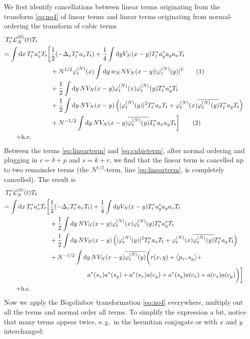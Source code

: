 \documentclass[11pt,a4paper,draft,DIV11]{scrartcl}	%
\newcommand{\di}{\textrm{d}}		%
\newcommand{\Lcal}{\mathcal{L}}		%
\newcommand{\hc}{\mbox{h.c.}}		%
\newcommand{\scal}[2]{\big<#1,#2\big>} %
\newcommand{\cc}[1]{\overline{#1}}	%
\newcommand{\ph}{\varphi_t^{(N)}}	%
\newcommand{\tagg}[1]{ \stepcounter{equation} \tag{\theequation} \label{eq:#1} } %
\newcommand{\eqr}[1]{\eqref{eq:#1}}			%
\begin{document}
We first identify cancellations between linear terms originating from the transform \eqr{no4} of linear terms and linear terms originating from normal-ordering the transform of cubic terms
\begin{align*}
T^*_t \Lcal^{(0)}_N(t) T_t \qquad \\
= \int \di x\, T^*_t a^*_x T_t \bigg[ &   \frac{1}{2}(-\Delta_x T^*_t a_x T_t)  + \frac{1}{4}\int \di y V_N(x-y) T^*_t a^*_y a_y a_x T_t \\
& + N^{1/2} \ph(x) \int \di y\, w_N N V_N(x-y) \lvert \ph(y) \rvert^2 \tagg{linearterm} \\
& + \frac{1}{2} \int \di y\, NV_N(x-y)  \ph(x) \ph(y)  T^*_t a^*_y T_t \\
& + \frac{1}{2} \int \di y\, NV_N(x-y) \left(  \lvert \ph(y)\rvert^2 T^*_t a_x T_t + \ph(x) \cc{\ph(y)} T^*_t a_y T_t  \right) \\
& + N^{-1/2} \int \di y\, NV_N(x-y) \cc{\ph(y)} T^*_t a_x a_y T_t  \bigg]\tagg{cubicterm} \\
+ \hc \qquad \quad
\end{align*}
Between the terms \eqr{linearterm} and \eqr{cubicterm}, after normal ordering and plugging in $c = \delta + p$ and $s = k + r$, we find that the linear term is cancelled up to two remainder terms (the $N^{1/2}$-term, line \eqr{linearterm}, is completely cancelled). The result is
\begin{align*}
T^*_t \Lcal^{(0)}_N(t) T_t \qquad \\
= \int \di x\, T^*_t a^*_x T_t \bigg[ &   \frac{1}{2}(-\Delta_x T^*_t a_x T_t)  + \frac{1}{4}\int \di y V_N(x-y) T^*_t a^*_y a_y a_x T_t \\
& + \frac{1}{2} \int \di y\, NV_N(x-y)  \ph(x) \ph(y)  T^*_t a^*_y T_t \\
& + \frac{1}{2} \int \di y\, NV_N(x-y) \left(  \lvert \ph(y)\rvert^2 T^*_t a_x T_t + \ph(x) \cc{\ph(y)} T^*_t a_y T_t  \right) \\
& + N^{-1/2} \int \di y\, NV_N(x-y) \cc{\ph(y)} \bigg( r(x,y) + \scal{p_x}{s_y} + \\
& \qquad \qquad \hspace{0.7cm}   a^*(s_x) a^*(s_y) + a^*(s_x) a(c_y)  + a^*(s_y) a(c_x) + a(c_x) a(c_y)  \bigg)  \bigg] \\
+ \hc \qquad \quad
\end{align*}
Now we apply the Bogoliubov transformation \eqr{no4} everywhere, multiply out all the terms and normal order all terms. To simplify the expression a bit, notice that many terms appear twice, e.\,g.\ in the hermitian conjugate or with $x$ and $y$ interchanged:
\end{document}
